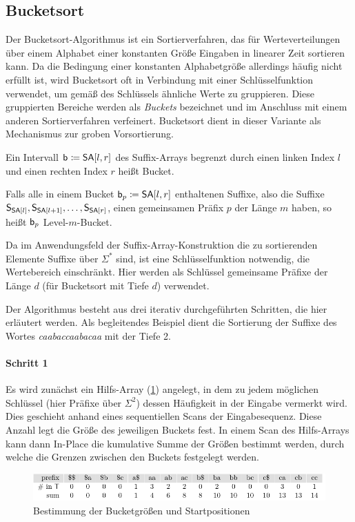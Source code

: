 \subsection{Bucketsort}
\label{section:bucketsort}

Der  Bucketsort-Algorithmus \cite[Kapitel 8.2 (dort unter dem Namen \emph{counting sort})]{Cormen2009} ist ein Sortierverfahren, das für Werteverteilungen über einem Alphabet einer konstanten Größe Eingaben in linearer Zeit sortieren kann. Da die Bedingung einer konstanten Alphabetgröße allerdings häufig nicht erfüllt ist, wird Bucketsort oft in Verbindung mit einer Schlüsselfunktion verwendet, um gemäß des Schlüssels \glqq ähnliche\grqq{} Werte zu gruppieren. Diese gruppierten Bereiche werden als \emph{Buckets} bezeichnet und im Anschluss mit einem anderen Sortierverfahren verfeinert. Bucketsort dient in dieser Variante als Mechanismus zur groben Vorsortierung.\par
\begin{definition}[Bucket]
	\label{def:bucket}
	Ein Intervall \(\bucket{} \coloneqq \sa[l, r]\) des Suffix-Arrays begrenzt durch einen linken Index \(l\) und einen rechten Index \(r\) heißt Bucket.\par
    Falls alle in einem Bucket \(\bucket{p} \coloneqq \sa[l, r]\) enthaltenen Suffixe, also die Suffixe \(\suffix{\sa[l]}, \suffix{\sa[l+1]}, \ldots, \suffix{\sa[r]}\), einen gemeinsamen Präfix \(p\) der Länge \(m\) haben, so heißt \(\mathsf{b}_{p}\) Level-\(m\)-Bucket.
\end{definition}
Da im Anwendungsfeld der Suffix-Array-Konstruktion die zu sortierenden Elemente Suffixe über \(\Sigma^\ast\) sind, ist eine Schlüsselfunktion notwendig, die Wertebereich einschränkt. Hier werden als Schlüssel gemeinsame Präfixe der Länge \(d\) (für Bucketsort mit Tiefe \(d\)) verwendet.\par
Der Algorithmus besteht aus drei iterativ durchgeführten Schritten, die hier erläutert werden. Als begleitendes Beispiel dient die Sortierung der Suffixe des Wortes \emph{caabaccaabacaa} mit der Tiefe 2.
\paragraph{Schritt 1}
Es wird zunächst ein Hilfs-Array (\cref{bucketsort:bkt}) angelegt, in dem zu jedem möglichen Schlüssel (hier Präfixe über \(\Sigma^2\)) dessen Häufigkeit in der Eingabe vermerkt wird. Dies geschieht anhand eines sequentiellen Scans der Eingabesequenz. Diese Anzahl legt die Größe des jeweiligen Buckets fest. In einem Scan des Hilfs-Arrays kann dann In-Place die kumulative Summe der Größen bestimmt werden, durch welche die Grenzen zwischen den Buckets festgelegt werden.
\begin{figure}[ht]
    \includegraphics[width=\textwidth]{kapitel/4_komponenten/sortieralgorithmen/bucketsort/step_01/bkt/image.pdf}
    \caption{Bestimmung der Bucketgrößen und Startpositionen}
    \label{bucketsort:bkt}
\end{figure}

